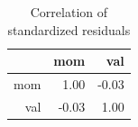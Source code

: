 \documentclass[12pt,letterpaper]{memoir}
\begin{document}
\begin{table}[ht]
\centering
\caption{Correlation of standardized residuals}
\begin{tabular}{rrr}
  \hline
 & mom & val \\ 
  \hline
mom & 1.00 & -0.03 \\ 
  val & -0.03 & 1.00 \\ 
   \hline
\end{tabular}
\end{table}
\end{document}
